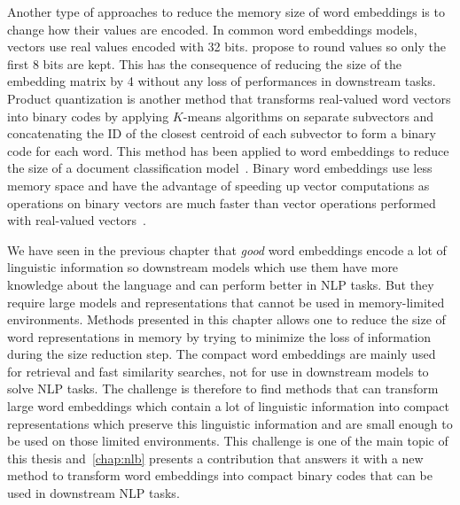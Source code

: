   Another type of approaches to reduce the memory size of word embeddings is to
  change how their values are encoded. In common word embeddings models, vectors
  use real values encoded with 32 bits. \citet{ling2016word} propose to round
  values so only the first 8 bits are kept. This has the consequence of reducing
  the size of the embedding matrix by 4 without any loss of performances in
  downstream tasks. Product quantization \citep{jegou2010product} is another
  method that transforms real-valued word vectors into binary codes by applying
  $K$-means algorithms on separate subvectors and concatenating the ID of the
  closest centroid of each subvector to form a binary code for each word. This
  method has been applied to word embeddings to reduce the size of a document
  classification model~\citep{joulin2016fasttext}. Binary word embeddings use
  less memory space and have the advantage of speeding up vector computations as
  operations on binary vectors are much faster than vector operations performed
  with real-valued vectors~\citep{norouzi2012fast, subercaze2015metric}.\medskip

  We have seen in the previous chapter that \textit{good} word embeddings encode
  a lot of linguistic information so downstream models which use them have more
  knowledge about the language and can perform better in NLP tasks. But they
  require large models and representations that cannot be used in memory-limited
  environments.  Methods presented in this chapter allows one to reduce the size
  of word representations in memory by trying to minimize the loss of
  information during the size reduction step. The compact word embeddings are
  mainly used for retrieval and fast similarity searches, not for use in
  downstream models to solve NLP tasks.  The challenge is therefore to find
  methods that can transform large word embeddings which contain a lot of
  linguistic information into compact representations which preserve this
  linguistic information and are small enough to be used on those limited
  environments. This challenge is one of the main topic of this thesis
  and~\autoref{chap:nlb} presents a contribution that answers it with a new
  method to transform word embeddings into compact binary codes that can be used
  in downstream NLP tasks.
